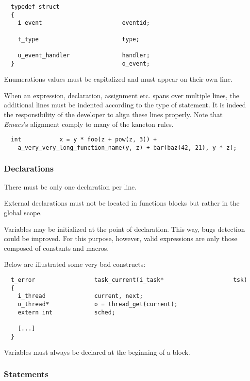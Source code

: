 \begin{verbatim}
  typedef struct
  {
    i_event                       eventid;

    t_type                        type;

    u_event_handler               handler;
  }                               o_event;
\end{verbatim}

Enumerations values must be capitalized and must appear on their own line.

When an expression, declaration, assignment etc. spans over multiple lines,
the additional lines must be indented according to the type of statement.
It is indeed the responsibility of the developer to align these lines
properly. Note that \textit{Emacs}'s alignment comply to many of the
kaneton rules.

\begin{verbatim}
  int           x = y * foo(z + pow(z, 3)) +
    a_very_very_long_function_name(y, z) + bar(baz(42, 21), y * z);
\end{verbatim}


\subsubsection{Declarations}

There must be only one declaration per line.

External declarations must not be located in functions blocks but rather in the
global scope.

Variables may be initialized at the point of declaration. This way, bugs
detection could be improved. For this purpose, however, valid expressions
are only those composed of constants and macros.

Below are illustrated some very bad constructs:

\begin{verbatim}
  t_error                 task_current(i_task*                    tsk)
  {
    i_thread              current, next;
    o_thread*             o = thread_get(current);
    extern int            sched;

    [...]
  }
\end{verbatim}

Variables must always be declared at the beginning of a block.


\subsubsection{Statements}

